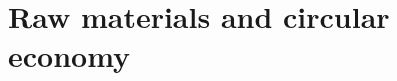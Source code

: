 \documentclass[../summary.tex]{subfiles}
\begin{document}
	
	\section{Raw materials and circular economy}
	
\end{document}
